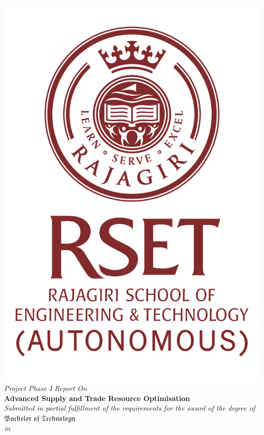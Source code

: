 \begin{center}
	\includegraphics[scale=0.35]{Figures/logo1.png}\\[0.5cm]
	\large \textit{Project Phase I Report On}\\[0.5cm]
	\Large \textbf{Advanced Supply and Trade Resource Optimisation}\\[0.5cm]
	\textit{Submitted in partial fulfillment of the
		requirements for the award of the degree of}\\[0.5cm]
	{\huge {$\mathfrak {Bachelor\; of\; Technology}$}}\\[.5cm]
	\textit{in}\\[.5cm]

\end{center}
